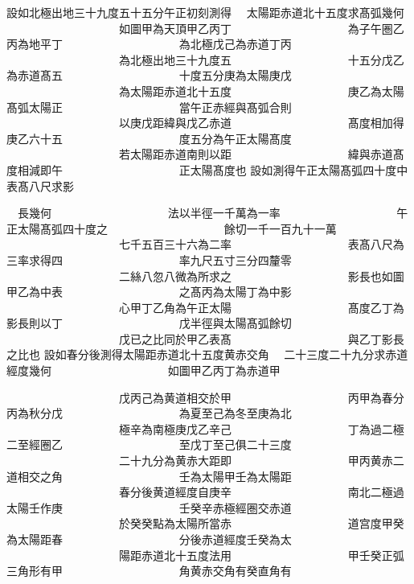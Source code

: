 \begin{正文}
\end{正文}
\begin{正文}
設如北極出地三十九度五十五分午正初刻測得
　太陽距赤道北十五度求髙弧幾何
　　　　　　　　　　如圖甲為天頂甲乙丙丁
　　　　　　　　　　為子午圏乙丙為地平丁
　　　　　　　　　　為北極戊己為赤道丁丙
　　　　　　　　　　為北極出地三十九度五
　　　　　　　　　　十五分戊乙為赤道髙五
　　　　　　　　　　十度五分庚為太陽庚戊
　　　　　　　　　　為太陽距赤道北十五度
　　　　　　　　　　庚乙為太陽髙弧太陽正
　　　　　　　　　　當午正赤經與髙弧合則
　　　　　　　　　　以庚戊距緯與戊乙赤道
　　　　　　　　　　髙度相加得庚乙六十五
　　　　　　　　　　度五分為午正太陽髙度
　　　　　　　　　　若太陽距赤道南則以距
　　　　　　　　　　緯與赤道髙度相減即午
　　　　　　　　　　正太陽髙度也
設如測得午正太陽髙弧四十度中表髙八尺求影
\par
\end{正文}\clearpage
{}
\begin{正文}
　長幾何
　　　　　　　　　　法以半徑一千萬為一率
　　　　　　　　　　午正太陽髙弧四十度之
　　　　　　　　　　餘切一千一百九十一萬
　　　　　　　　　　七千五百三十六為二率
　　　　　　　　　　表髙八尺為三率求得四
　　　　　　　　　　率九尺五寸三分四釐零
　　　　　　　　　　二絲八忽八微為所求之
　　　　　　　　　　影長也如圖甲乙為中表
　　　　　　　　　　之髙丙為太陽丁為中影
　　　　　　　　　　心甲丁乙角為午正太陽
　　　　　　　　　　髙度乙丁為影長則以丁
　　　　　　　　　　戊半徑與太陽髙弧餘切
　　　　　　　　　　戊已之比同於甲乙表髙
　　　　　　　　　　與乙丁影長之比也
設如春分後測得太陽距赤道北十五度黄赤交角
　二十三度二十九分求赤道經度幾何
　　　　　　　　　　如圖甲乙丙丁為赤道甲
\par
\end{正文}\clearpage
{}
\begin{正文}
　　　　　　　　　　戊丙己為黄道相交於甲
　　　　　　　　　　丙甲為春分丙為秋分戊
　　　　　　　　　　為夏至己為冬至庚為北
　　　　　　　　　　極辛為南極庚戊乙辛己
　　　　　　　　　　丁為過二極二至經圈乙
　　　　　　　　　　至戊丁至己俱二十三度
　　　　　　　　　　二十九分為黄赤大距即
　　　　　　　　　　甲丙黄赤二道相交之角
　　　　　　　　　　壬為太陽甲壬為太陽距
　　　　　　　　　　春分後黄道經度自庚辛
　　　　　　　　　　南北二極過太陽壬作庚
　　　　　　　　　　壬癸辛赤極經圏交赤道
　　　　　　　　　　於癸癸點為太陽所當赤
　　　　　　　　　　道宫度甲癸為太陽距春
　　　　　　　　　　分後赤道經度壬癸為太
　　　　　　　　　　陽距赤道北十五度法用
　　　　　　　　　　甲壬癸正弧三角形有甲
　　　　　　　　　　角黄赤交角有癸直角有
\par
\end{正文}\clearpage
